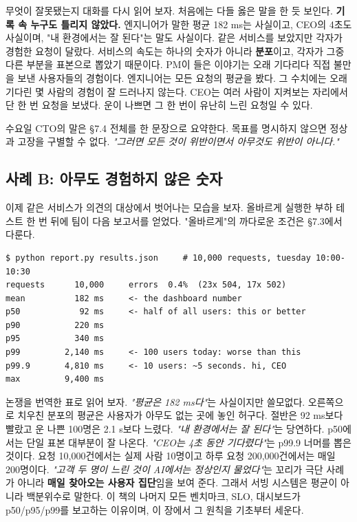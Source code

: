 무엇이 잘못됐는지 대화를 다시 읽어 보자. 처음에는 다들 옳은 말을 한 듯 보인다. \textbf{기록 속 누구도 틀리지 않았다.} 엔지니어가 말한 평균 182 ms는 사실이고, CEO의 4초도 사실이며, "내 환경에서는 잘 된다"는 말도 사실이다. 같은 서비스를 보았지만 각자가 경험한 요청이 달랐다. 서비스의 속도는 하나의 숫자가 아니라 \textbf{분포}이고, 각자가 그중 다른 부분을 표본으로 뽑았기 때문이다. PM이 들은 이야기는 오래 기다리다 직접 불만을 보낸 사용자들의 경험이다. 엔지니어는 모든 요청의 평균을 봤다. 그 수치에는 오래 기다린 몇 사람의 경험이 잘 드러나지 않는다. CEO는 여러 사람이 지켜보는 자리에서 단 한 번 요청을 보냈다. 운이 나쁘면 그 한 번이 유난히 느린 요청일 수 있다.

수요일 CTO의 말은 §7.4 전체를 한 문장으로 요약한다. 목표를 명시하지 않으면 정상과 고장을 구별할 수 없다. \textit{"그러면 모든 것이 위반이면서 아무것도 위반이 아니다."}

\subsection*{사례 B: 아무도 경험하지 않은 숫자}

이제 같은 서비스가 의견의 대상에서 벗어나는 모습을 보자. 올바르게 실행한 부하 테스트 한 번 뒤에 팀이 다음 보고서를 얻었다. "올바르게"의 까다로운 조건은 §7.3에서 다룬다.

\begin{terminalbox}
\begin{Verbatim}[breaklines=true,breakanywhere=true,fontsize=\small,formatcom=\color{tbbtermfg},codes=\tbbcodeactive]
$ python report.py results.json     # 10,000 requests, tuesday 10:00-10:30
requests      10,000     errors  0.4%  (23x 504, 17x 502)
mean          182 ms     <- the dashboard number
p50            92 ms     <- half of all users: this or better
p90           220 ms
p95           340 ms
p99         2,140 ms     <- 100 users today: worse than this
p99.9       4,810 ms     <- 10 users: ~5 seconds. hi, CEO
max         9,400 ms
\end{Verbatim}
\end{terminalbox}

논쟁을 번역한 표로 읽어 보자. \textit{"평균은 182 ms다"}는 사실이지만 쓸모없다. 오른쪽으로 치우친 분포의 평균은 사용자가 아무도 없는 곳에 놓인 허구다. 절반은 92 ms보다 빨랐고 운 나쁜 100명은 2.1 s보다 느렸다. \textit{"내 환경에서는 잘 된다"}는 당연하다. p50에서는 단일 표본 대부분이 잘 나온다. \textit{"CEO는 4초 동안 기다렸다"}는 p99.9 너머를 뽑은 것이다. 요청 10,000건에서는 실제 사람 10명이고 하루 요청 200,000건에서는 매일 200명이다. \textit{"고객 두 명이 느린 것이 AI에서는 정상인지 물었다"}는 꼬리가 극단 사례가 아니라 \textbf{매일 찾아오는 사용자 집단}임을 보여 준다. 그래서 서빙 시스템은 평균이 아니라 백분위수로 말한다. 이 책의 나머지 모든 벤치마크, SLO, 대시보드가 p50/p95/p99를 보고하는 이유이며, 이 장에서 그 원칙을 기초부터 세운다.

